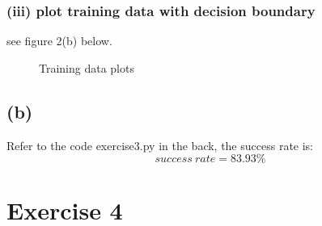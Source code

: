 \documentclass[11pt]{article}
\begin{document}
\subsubsection*{(iii) plot training data with decision boundary}
see figure 2(b) below.
\begin{figure}[h]
	\centering
	\caption{Training data plots}
\end{figure}
\subsection*{(b)}
Refer to the code exercise3.py in the back, the success rate is:
$$success\ rate = 83.93\%$$
\pagebreak

\section*{Exercise 4}
\end{document}
